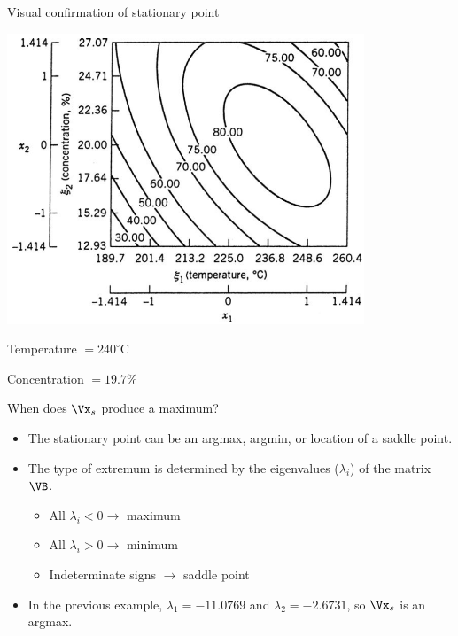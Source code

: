 \documentclass[10pt]{beamer}
\begin{document}
\begin{frame}{Visual confirmation of stationary point}

\includegraphics[width=0.8\textwidth]{figures/rsm_chemical_contour.png}

Temperature $= 240^\circ$C

\medskip
Concentration $= 19.7$\%
	
\end{frame}

\begin{frame}{When does $\Vx_s$ produce a maximum?}

\begin{itemize}
	\item The stationary point can be an argmax, argmin, or location of a saddle point.
	\item<2-> The type of extremum is determined by the eigenvalues ($\lambda_i$) of the matrix $\VB$.
		\begin{itemize}
			\item All $\lambda_i < 0 \rightarrow$ maximum
			\item All $\lambda_i > 0 \rightarrow$ minimum
			\item Indeterminate signs $\rightarrow$ saddle point
		\end{itemize}
	\item<3-> In the previous example, $\lambda_1=-11.0769$ and $\lambda_2=-2.6731$, so $\Vx_s$ is an argmax.
\end{itemize}
	
\end{frame}
\end{document}
